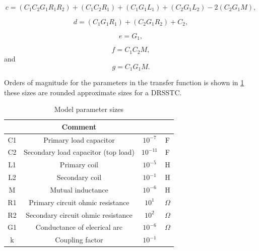 \begin{equation} \label{eq:5_3}
    c = (C_1 C_2 G_1 R_1 R_2)+(C_1 C_2 R_1)+(C_1 G_1 L_1)+(C_2 G_1 L_2)-2 (C_2 G_1 M),
\end{equation}

\begin{equation} \label{eq:5_4}
    d = (C_1 G_1 R_1)+(C_2 G_1 R_2)+C_2,
\end{equation}

\begin{equation} \label{eq:5_5}
    e = G_1,
\end{equation}

\begin{equation} \label{eq:5_6}
    f = C_1 C_2 M,
\end{equation}
and
\begin{equation} \label{eq:5_7}
    g = C_1 G_1 M.
\end{equation}

Orders of magnitude for the parameters in the transfer function is shown in \cref{tab:mod_params} these sizes are rounded approximate sizes for a DRSSTC.

\begin{table}[]
    \centering
    \begin{tabular}{c|c|c|c}
         & Comment &  &\\ \hline
        C1 & Primary load capacitor                 & $10^{-7}$ & F \\
        C2 & Secondary load capacitor (top load)    & $10^{-11}$& F \\
        L1 & Primary coil                           & $10^{-5}$ & H \\
        L2 & Secondary coil                         & $10^{-1}$ & H \\
        M  & Mutual inductance                      & $10^{-6}$ & H \\
        R1 & Primary circuit ohmic resistance       & $10^{1}$  & $\Omega$ \\
        R2 & Secondary circuit ohmic resistance     & $10^{2}$  & $\Omega$ \\
        G1 & Conductance of elecrical arc           & $10^{-6}$  & $\Omega$ \\
        k  & Coupling factor                        & $10^{-1}$ & 
    \end{tabular}
    \caption{Model parameter sizes}
    \label{tab:mod_params}
\end{table}


